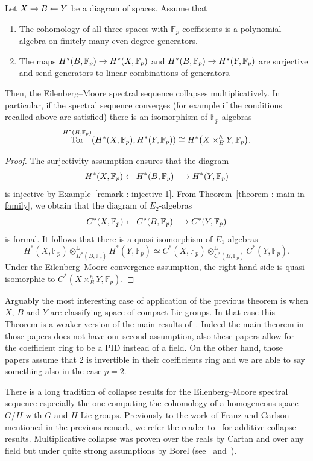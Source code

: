 \documentclass[AHL,Unicode,longabstracts,published]{cedram}
\DeclareMathOperator{\rTor}{Tor}
\renewcommand{\L}{\mathrm{L}}
\newcommand{\FF}{\mathbb{F}}
\renewcommand*{\to}{\mathchoice{\longrightarrow}{\rightarrow}{\rightarrow}{\rightarrow}}
\let\originalleft\left
\let\originalright\right
\renewcommand{\left}{\mathopen{}\mathclose\bgroup\originalleft}
\renewcommand{\right}{\aftergroup\egroup\originalright}
\newcommand{\FF}{\mathbb{F}}
\begin{document}
\begin{theo}\label{theorem : formality and EMSS}
Let $X\to B\leftarrow Y$ be a diagram of spaces. Assume that
\begin{enumerate}
\item\label{theo6.7.1} The cohomology of all three spaces with $\FF_p$ coefficients is a polynomial algebra on finitely many even degree generators.
\item\label{theo6.7.2} The maps $H^*(B,\FF_p)\to H^*(X,\FF_p)$ and $H^*(B,\FF_p)\to H^*(Y,\FF_p)$ are surjective and send generators to linear combinations of generators.
\end{enumerate}
Then, the Eilenberg--Moore spectral sequence collapses multiplicatively. In particular, if the spectral sequence converges (for example if the conditions recalled above are satisfied) there is an isomorphism of $\FF_p$-algebras
\[
\rTor^{H^*(B,\FF_p)}\left(H^*(X,\FF_p),H^*(Y,\FF_p)\right)\cong H^*\left(X\times^h_BY,\FF_p\right).
\]
\end{theo}

\begin{proof}
The surjectivity assumption ensures that the diagram
\[
H^*(X,\FF_p)\leftarrow H^*(B,\FF_p)\to H^*(Y,\FF_p)
\]
is injective by Example~\ref{remark : injective 1}. From Theorem~\ref{theorem : main in family}, we obtain that the diagram of $E_2$-algebras
\[
C^*(X,\FF_p)\leftarrow C^*(B,\FF_p)\to C^*(Y,\FF_p)
\]
is formal. It follows that there is a quasi-isomorphism of $E_1$-algebras
\[
H^*(X,\FF_p)\otimes_{H^*(B,\FF_p)}^{\L}H^*(Y,\FF_p)\simeq C^*(X,\FF_p)\otimes_{C^*(B,\FF_p)}^{\L}C^*(Y,\FF_p).
\]
Under the Eilenberg--Moore convergence assumption, the right-hand side is quasi-isomorphic to $C^*(X\times^h_BY,\FF_p)$.
\end{proof}

\begin{rema}
Arguably the most interesting case of application of the previous theorem is when $X$, $B$ and $Y$ are classifying space of compact Lie groups. In that case this Theorem is a weaker version of the main results of~\cite{franzhomogeneous,carlsontwosided}. Indeed the main theorem in those papers does not have our second assumption, also these papers allow for the coefficient ring to be a PID instead of a field. On the other hand, those papers assume that $2$ is invertible in their coefficients ring and we are able to say something also in the case $p=2$.
\end{rema}

\begin{rema}
There is a long tradition of collapse results for the Eilenberg--Moore spectral sequence especially the one computing the cohomology of a homogeneous space $G/H$ with $G$ and $H$ Lie groups. Previously to the work of Franz and Carlson mentioned in the previous remark, we refer the reader to~\cite{baumcohomology,gugenheimmay,wolfcohomology} for additive collapse results. Multiplicative collapse was proven over the reals by Cartan and over any field but under quite strong assumptions by Borel (see~\cite[Théorème~6]{cartan} and~\cite[Proposition~30.2]{borel}).
\end{rema}
\end{document}
